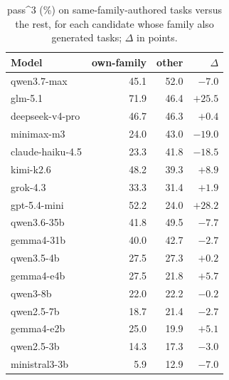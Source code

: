 \begin{table}[h]
  \centering \small
  \begin{tabular}{lrrr}
    \toprule
    Model & own-family & other & $\Delta$ \\
    \midrule
    qwen3.7-max & 45.1 & 52.0 & $-7.0$ \\
    glm-5.1 & 71.9 & 46.4 & $+25.5$ \\
    deepseek-v4-pro & 46.7 & 46.3 & $+0.4$ \\
    minimax-m3 & 24.0 & 43.0 & $-19.0$ \\
    claude-haiku-4.5 & 23.3 & 41.8 & $-18.5$ \\
    kimi-k2.6 & 48.2 & 39.3 & $+8.9$ \\
    grok-4.3 & 33.3 & 31.4 & $+1.9$ \\
    gpt-5.4-mini & 52.2 & 24.0 & $+28.2$ \\
    qwen3.6-35b & 41.8 & 49.5 & $-7.7$ \\
    gemma4-31b & 40.0 & 42.7 & $-2.7$ \\
    qwen3.5-4b & 27.5 & 27.3 & $+0.2$ \\
    gemma4-e4b & 27.5 & 21.8 & $+5.7$ \\
    qwen3-8b & 22.0 & 22.2 & $-0.2$ \\
    qwen2.5-7b & 18.7 & 21.4 & $-2.7$ \\
    gemma4-e2b & 25.0 & 19.9 & $+5.1$ \\
    qwen2.5-3b & 14.3 & 17.3 & $-3.0$ \\
    ministral3-3b & 5.9 & 12.9 & $-7.0$ \\
    \bottomrule
  \end{tabular}
  \caption{pass\textasciicircum{}3 (\%) on same-family-authored tasks versus
    the rest, for each candidate whose family also generated tasks; $\Delta$
    in points.}
  \label{tab:family}
\end{table}

